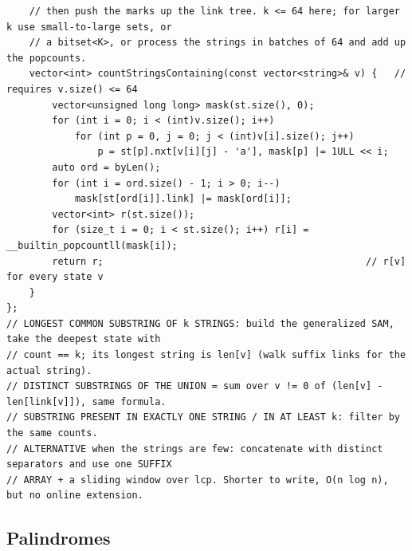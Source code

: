 \documentclass[9pt,a4paper,twocolumn]{extarticle}
\begin{document}
\begin{lstlisting}
    // then push the marks up the link tree. k <= 64 here; for larger k use small-to-large sets, or
    // a bitset<K>, or process the strings in batches of 64 and add up the popcounts.
    vector<int> countStringsContaining(const vector<string>& v) {   // requires v.size() <= 64
        vector<unsigned long long> mask(st.size(), 0);
        for (int i = 0; i < (int)v.size(); i++)
            for (int p = 0, j = 0; j < (int)v[i].size(); j++)
                p = st[p].nxt[v[i][j] - 'a'], mask[p] |= 1ULL << i;
        auto ord = byLen();
        for (int i = ord.size() - 1; i > 0; i--)
            mask[st[ord[i]].link] |= mask[ord[i]];
        vector<int> r(st.size());
        for (size_t i = 0; i < st.size(); i++) r[i] = __builtin_popcountll(mask[i]);
        return r;                                              // r[v] for every state v
    }
};
// LONGEST COMMON SUBSTRING OF k STRINGS: build the generalized SAM, take the deepest state with
// count == k; its longest string is len[v] (walk suffix links for the actual string).
// DISTINCT SUBSTRINGS OF THE UNION = sum over v != 0 of (len[v] - len[link[v]]), same formula.
// SUBSTRING PRESENT IN EXACTLY ONE STRING / IN AT LEAST k: filter by the same counts.
// ALTERNATIVE when the strings are few: concatenate with distinct separators and use one SUFFIX
// ARRAY + a sliding window over lcp. Shorter to write, O(n log n), but no online extension.
\end{lstlisting}

\subsection{Palindromes}

\filbreak
\end{document}
